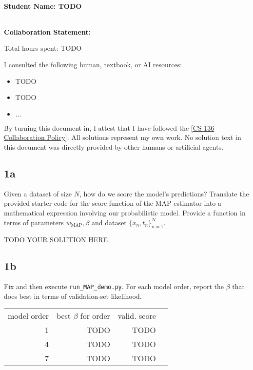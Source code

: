 \documentclass[10pt]{article}
\newcommand{\officialdirections}[1]{{\color{purple} #1}}
\begin{document}
~\\ %
{\Large{\bf Student Name: TODO}}

~\\ %
{\bf Collaboration Statement:}

Total hours spent: TODO

I consulted the following human, textbook, or AI resources:
\begin{itemize}
\item TODO
\item TODO
\item $\ldots$	
\end{itemize}

By turning this document in, I attest that I have followed the 
\href{https://www.cs.tufts.edu/cs/136/2025f/index.html#collaboration}{[CS 136 Collaboration Policy]}. All solutions represent my own work. No solution text in this document was directly provided by other humans or artificial agents. 

\setcounter{tocdepth}{2}
\tableofcontents

\newpage

\subsection{1a}
\officialdirections{
Given a dataset of size $N$, how do we score the model's predictions? Translate the provided starter code for the score function of the MAP estimator into a mathematical expression involving our probabilistic model. Provide a function in terms of parameters $w_\text{MAP}, \beta$ and dataset $\{x_n,t_n\}_{n=1}^N$.}

TODO YOUR SOLUTION HERE

\subsection{1b}
\officialdirections{Fix and then execute \texttt{run\_MAP\_demo.py}. For each model order, report the $\beta$ that does best in terms of validation-set likelihood.}

\begin{table}[!h]
\begin{tabular}{r r r r}
model order & best $\beta$ for order & valid. score
\\
1 & TODO & TODO 
\\
4 & TODO & TODO 
\\
7 & TODO & TODO
\end{tabular}
\end{table}
\end{document}
